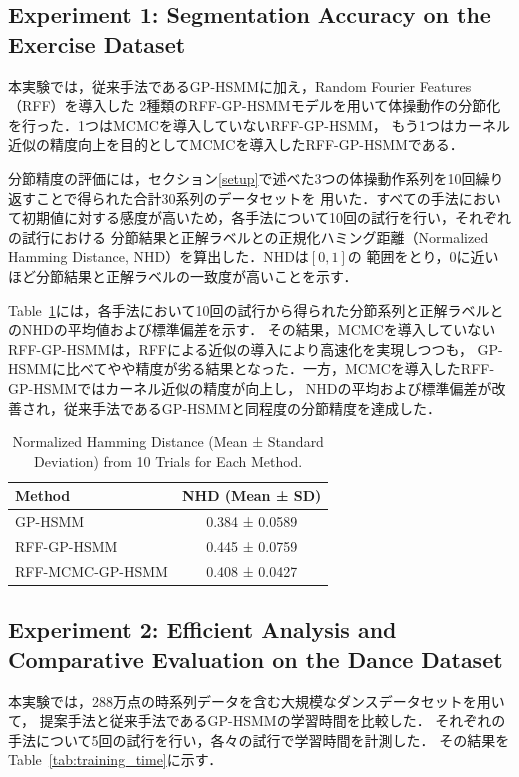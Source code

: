 \documentclass[conference]{IEEEtran}
\begin{document}
\subsection{Experiment 1: Segmentation Accuracy on the Exercise Dataset}\label{ITH}
本実験では，従来手法であるGP-HSMMに加え，Random Fourier Features（RFF）を導入した
2種類のRFF-GP-HSMMモデルを用いて体操動作の分節化を行った．1つはMCMCを導入していないRFF-GP-HSMM，
もう1つはカーネル近似の精度向上を目的としてMCMCを導入したRFF-GP-HSMMである．

分節精度の評価には，セクション\ref{setup}で述べた3つの体操動作系列を10回繰り返すことで得られた合計30系列のデータセットを
用いた．すべての手法において初期値に対する感度が高いため，各手法について10回の試行を行い，それぞれの試行における
分節結果と正解ラベルとの正規化ハミング距離（Normalized Hamming Distance, NHD）を算出した．NHDは$[0,1]$の
範囲をとり，0に近いほど分節結果と正解ラベルの一致度が高いことを示す．

Table~\ref{tab:nhd_results}には，各手法において10回の試行から得られた分節系列と正解ラベルとのNHDの平均値および標準偏差を示す．
その結果，MCMCを導入していないRFF-GP-HSMMは，RFFによる近似の導入により高速化を実現しつつも，
GP-HSMMに比べてやや精度が劣る結果となった．一方，MCMCを導入したRFF-GP-HSMMではカーネル近似の精度が向上し，
NHDの平均および標準偏差が改善され，従来手法であるGP-HSMMと同程度の分節精度を達成した．

\begin{table}[t]
  \caption{Normalized Hamming Distance (Mean ± Standard Deviation) from 10 Trials for Each Method.}
  \label{tab:nhd_results}
  \centering
  \begin{tabular}{lc}
    \hline
    \textbf{Method} & \textbf{NHD (Mean ± SD)} \\
    \hline
    GP-HSMM & 0.384 ± 0.0589 \\
    RFF-GP-HSMM & 0.445 ± 0.0759 \\
    RFF-MCMC-GP-HSMM & 0.408 ± 0.0427 \\
    \hline
  \end{tabular}
\end{table}

\subsection{Experiment 2: Efficient Analysis and Comparative Evaluation on the Dance Dataset}
本実験では，288万点の時系列データを含む大規模なダンスデータセットを用いて，
提案手法と従来手法であるGP-HSMMの学習時間を比較した．
それぞれの手法について5回の試行を行い，各々の試行で学習時間を計測した．
その結果をTable~\ref{tab:training_time}に示す．
\end{document}
